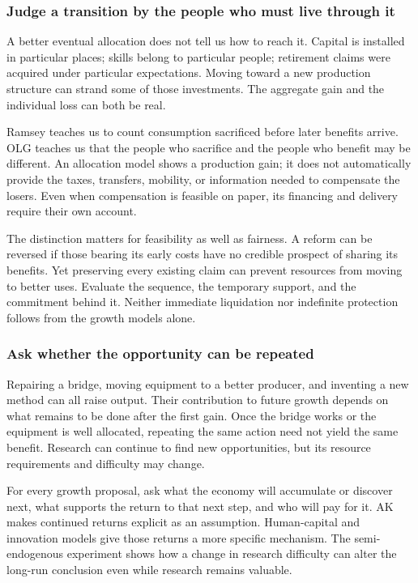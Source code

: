 \subsubsection{Judge a transition by the people who must live through it}

A better eventual allocation does not tell us how to reach it. Capital
is installed in particular places; skills belong to particular people;
retirement claims were acquired under particular expectations. Moving
toward a new production structure can strand some of those investments.
The aggregate gain and the individual loss can both be real.

Ramsey teaches us to count consumption sacrificed before later benefits
arrive. OLG teaches us that the people who sacrifice and the people who
benefit may be different. An allocation model shows a production gain;
it does not automatically provide the taxes, transfers, mobility, or
information needed to compensate the losers. Even when compensation is
feasible on paper, its financing and delivery require their own account.

The distinction matters for feasibility as well as fairness. A reform can
be reversed if those bearing its early costs have no credible prospect of
sharing its benefits. Yet preserving every existing claim can prevent
resources from moving to better uses. Evaluate the sequence, the temporary
support, and the commitment behind it. Neither immediate liquidation nor
indefinite protection follows from the growth models alone.

\subsubsection{Ask whether the opportunity can be repeated}

Repairing a bridge, moving equipment to a better producer, and inventing
a new method can all raise output. Their contribution to future growth
depends on what remains to be done after the first gain. Once the bridge
works or the equipment is well allocated, repeating the same action need
not yield the same benefit. Research can continue to find new opportunities,
but its resource requirements and difficulty may change.

For every growth proposal, ask what the economy will accumulate or discover
next, what supports the return to that next step, and who will pay for it.
AK makes continued returns explicit as an assumption. Human-capital and
innovation models give those returns a more specific mechanism. The
semi-endogenous experiment shows how a change in research difficulty can
alter the long-run conclusion even while research remains valuable.


